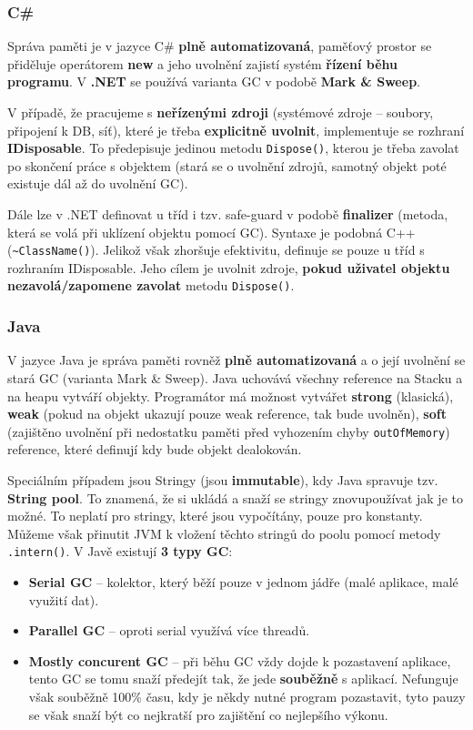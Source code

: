 \subsubsection{C\#}
Správa paměti je v jazyce C\# \textbf{plně automatizovaná}, paměťový prostor se přiděluje operátorem \textbf{new} a jeho uvolnění zajistí systém \textbf{řízení běhu programu}. V \textbf{.NET} se používá varianta GC v podobě \textbf{Mark \& Sweep}.

V případě, že pracujeme s \textbf{neřízenými zdroji} (systémové zdroje -- soubory, připojení k DB, síť), které je třeba \textbf{explicitně uvolnit}, implementuje se rozhraní \textbf{IDisposable}. To předepisuje jedinou metodu \texttt{Dispose()}, kterou je třeba zavolat po skončení práce s objektem (stará se o uvolnění zdrojů, samotný objekt poté existuje dál až do uvolnění GC).

Dále lze v .NET definovat u tříd i tzv. safe-guard v podobě \textbf{finalizer} (metoda, která se volá při uklízení objektu pomocí GC). Syntaxe je podobná C++ (\texttt{\textasciitilde{}ClassName()}). Jelikož však zhoršuje efektivitu, definuje se pouze u tříd s rozhraním IDisposable. Jeho cílem je uvolnit zdroje, \textbf{pokud uživatel objektu nezavolá/zapomene zavolat} metodu \texttt{Dispose()}. 

\subsubsection{Java}
V jazyce Java je správa paměti rovněž \textbf{plně automatizovaná} a o její uvolnění se stará GC (varianta Mark \& Sweep). Java uchovává všechny reference na Stacku a na heapu vytváří objekty. Programátor má možnost vytvářet \textbf{strong} (klasická), \textbf{weak} (pokud na objekt ukazují pouze weak reference, tak bude uvolněn), \textbf{soft} (zajištěno uvolnění při nedostatku paměti před vyhozením chyby \texttt{outOfMemory}) reference, které definují kdy bude objekt dealokován.

Speciálním případem jsou Stringy (jsou \textbf{immutable}), kdy Java spravuje tzv. \textbf{String pool}. To znamená, že si ukládá a snaží se stringy znovupoužívat jak je to možné. To neplatí pro stringy, které jsou vypočítány, pouze pro konstanty. Můžeme však přinutit JVM k vložení těchto stringů do poolu pomocí metody \texttt{.intern()}. V Javě existují \textbf{3 typy GC}:
\begin{itemize}
\item \textbf{Serial GC} -- kolektor, který běží pouze v jednom jádře (malé aplikace, malé využití dat).
\item \textbf{Parallel GC} -- oproti serial využívá více threadů.
\item \textbf{Mostly concurent GC} -- při běhu GC vždy dojde k pozastavení aplikace, tento GC se tomu snaží předejít tak, že jede \textbf{souběžně} s aplikací. Nefunguje však souběžně 100\% času, kdy je někdy nutné program pozastavit, tyto pauzy se však snaží být co nejkratší pro zajištění co nejlepšího výkonu.
\end{itemize}

